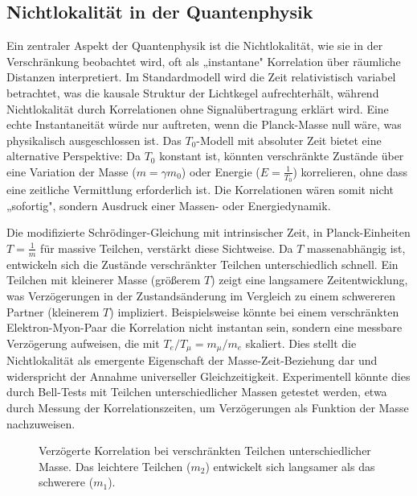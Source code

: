 \documentclass[a4paper,12pt]{article}
\begin{document}
	\subsection{Nichtlokalität in der Quantenphysik}
	Ein zentraler Aspekt der Quantenphysik ist die Nichtlokalität, wie sie in der Verschränkung beobachtet wird, oft als „instantane" Korrelation über räumliche Distanzen interpretiert. Im Standardmodell wird die Zeit relativistisch variabel betrachtet, was die kausale Struktur der Lichtkegel aufrechterhält, während Nichtlokalität durch Korrelationen ohne Signalübertragung erklärt wird. Eine echte Instantaneität würde nur auftreten, wenn die Planck-Masse null wäre, was physikalisch ausgeschlossen ist. Das \( T_0 \)-Modell mit absoluter Zeit bietet eine alternative Perspektive: Da \( T_0 \) konstant ist, könnten verschränkte Zustände über eine Variation der Masse (\( m = \gamma m_0 \)) oder Energie (\( E = \frac{1}{T_0} \)) korrelieren, ohne dass eine zeitliche Vermittlung erforderlich ist. Die Korrelationen wären somit nicht „sofortig", sondern Ausdruck einer Massen- oder Energiedynamik.
	
	Die modifizierte Schrödinger-Gleichung mit intrinsischer Zeit, in Planck-Einheiten \( T = \frac{1}{m} \) für massive Teilchen, verstärkt diese Sichtweise. Da \( T \) massenabhängig ist, entwickeln sich die Zustände verschränkter Teilchen unterschiedlich schnell. Ein Teilchen mit kleinerer Masse (größerem \( T \)) zeigt eine langsamere Zeitentwicklung, was Verzögerungen in der Zustandsänderung im Vergleich zu einem schwereren Partner (kleinerem \( T \)) impliziert. Beispielsweise könnte bei einem verschränkten Elektron-Myon-Paar die Korrelation nicht instantan sein, sondern eine messbare Verzögerung aufweisen, die mit \( T_e / T_\mu = m_\mu / m_e \) skaliert. Dies stellt die Nichtlokalität als emergente Eigenschaft der Masse-Zeit-Beziehung dar und widerspricht der Annahme universeller Gleichzeitigkeit. Experimentell könnte dies durch Bell-Tests mit Teilchen unterschiedlicher Massen getestet werden, etwa durch Messung der Korrelationszeiten, um Verzögerungen als Funktion der Masse nachzuweisen.
	
	\begin{figure}[h]
		\centering
		\caption{Verzögerte Korrelation bei verschränkten Teilchen unterschiedlicher Masse. Das leichtere Teilchen ($m_2$) entwickelt sich langsamer als das schwerere ($m_1$).}
	\end{figure}
	
\end{document}
